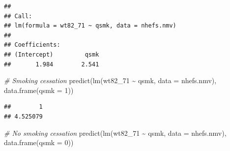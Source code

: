 \documentclass[
  10pt,
]{book}
\newenvironment{Shaded}{\begin{snugshade}}{\end{snugshade}}
\newcommand{\AttributeTok}[1]{\textcolor[rgb]{0.77,0.63,0.00}{#1}}
\newcommand{\CommentTok}[1]{\textcolor[rgb]{0.56,0.35,0.01}{\textit{#1}}}
\newcommand{\DecValTok}[1]{\textcolor[rgb]{0.00,0.00,0.81}{#1}}
\newcommand{\FunctionTok}[1]{\textcolor[rgb]{0.00,0.00,0.00}{#1}}
\newcommand{\NormalTok}[1]{#1}
\newcommand{\OtherTok}[1]{\textcolor[rgb]{0.56,0.35,0.01}{#1}}
\newcommand{\SpecialCharTok}[1]{\textcolor[rgb]{0.00,0.00,0.00}{#1}}
\newcommand{\StringTok}[1]{\textcolor[rgb]{0.31,0.60,0.02}{#1}}
\begin{document}
\begin{Shaded}
\end{Shaded}

\begin{verbatim}
## 
## Call:
## lm(formula = wt82_71 ~ qsmk, data = nhefs.nmv)
## 
## Coefficients:
## (Intercept)         qsmk  
##       1.984        2.541
\end{verbatim}

\begin{Shaded}
\begin{Highlighting}[]
\CommentTok{\# Smoking cessation}
\FunctionTok{predict}\NormalTok{(}\FunctionTok{lm}\NormalTok{(wt82\_71 }\SpecialCharTok{\textasciitilde{}}\NormalTok{ qsmk, }\AttributeTok{data =}\NormalTok{ nhefs.nmv), }\FunctionTok{data.frame}\NormalTok{(}\AttributeTok{qsmk =} \DecValTok{1}\NormalTok{))}
\end{Highlighting}
\end{Shaded}

\begin{verbatim}
##        1 
## 4.525079
\end{verbatim}

\begin{Shaded}
\begin{Highlighting}[]
\CommentTok{\# No smoking cessation}
\FunctionTok{predict}\NormalTok{(}\FunctionTok{lm}\NormalTok{(wt82\_71 }\SpecialCharTok{\textasciitilde{}}\NormalTok{ qsmk, }\AttributeTok{data =}\NormalTok{ nhefs.nmv), }\FunctionTok{data.frame}\NormalTok{(}\AttributeTok{qsmk =} \DecValTok{0}\NormalTok{)) }
\end{Highlighting}
\end{Shaded}
\end{document}
